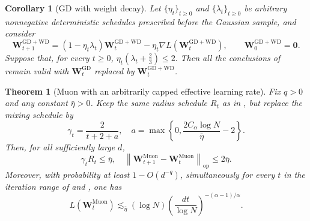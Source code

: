 \documentclass[11pt]{article}
\newtheorem{theorem}{Theorem}[section]
\newtheorem{corollary}[corollary]{Corollary}
\newtheorem{remark}[remark]{Remark}
\theoremstyle{definition}
\newcommand{\Wb}{\mathbf{W}}
\newcommand{\eps}{\varepsilon}
\newcommand{\normop}[1]{\left\lVert #1\right\rVert_{\mathrm{op}}}
\begin{document}
\begin{corollary}[GD with weight decay]
\label{cor:gd-weight-decay}
Let $\{\eta_t\}_{t\geq0}$ and $\{\lambda_t\}_{t\geq0}$ be arbitrary
nonnegative deterministic schedules prescribed before the Gaussian sample,
and consider
\[
\Wb^{\mathrm{GD+WD}}_{t+1}
=
(1-\eta_t\lambda_t)\Wb^{\mathrm{GD+WD}}_t
-\eta_t\nabla L(\Wb^{\mathrm{GD+WD}}_t),
\qquad
\Wb^{\mathrm{GD+WD}}_0=\mathbf 0.
\]
Suppose that, for every $t\geq0$,
$\eta_t\left(\lambda_t+\frac23\right)\leq 2.$
Then all the conclusions of  remain valid with
$\Wb_t^{\mathrm{GD}}$ replaced by $\Wb_t^{\mathrm{GD+WD}}$. 
\end{corollary}

\begin{theorem}[Muon with an arbitrarily capped effective learning rate]
\label{thm:capped}
Fix $q>0$ and any constant $\bar\eta>0$.  Keep the same radius schedule
$R_t$ as in , but replace the mixing schedule by
\[
\gamma_t=\frac{2}{t+2+a},
\quad
a=\max\left\{
0,\frac{2C_\alpha\log N}{\bar\eta}-2
\right\}.
\]
Then, for all sufficiently large $d$,
\[
\gamma_tR_t\leq\bar\eta,
\quad
\normop{\Wb_{t+1}^{\mathrm{Muon}}-\Wb_t^{\mathrm{Muon}}}
\leq2\bar\eta.
\]
Moreover, with
probability at least $1-O(d^{-q})$, simultaneously for every $t$ in the iteration range of  and ,
one has
\[
L(\Wb_t^{\mathrm{Muon}})
\lesssim_{\bar\eta}
(\log N)\left(\frac{dt}{\log N}\right)^{-(\alpha-1)/\alpha}.
\]
\end{theorem}

\end{document}
